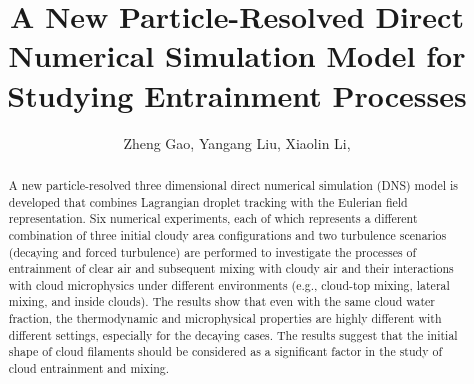 \documentclass[draft,jgrga]{AGUTeX}
\begin{document}
\title{A New Particle-Resolved Direct Numerical Simulation Model for Studying Entrainment Processes}
\author{Zheng Gao,
Yangang Liu,
Xiaolin Li,}


\begin{abstract}
A new particle-resolved three dimensional direct numerical simulation (DNS) model is developed that combines Lagrangian droplet tracking with the Eulerian field representation. Six numerical experiments, each of which represents a different combination of three initial cloudy area configurations and two turbulence scenarios (decaying and forced turbulence) are performed to investigate the processes of entrainment of clear air and subsequent mixing with cloudy air and their interactions with cloud microphysics under different environments (e.g., cloud-top mixing, lateral mixing, and inside clouds). The results show that even with the same cloud water fraction, the thermodynamic and microphysical properties are highly different with different settings, especially for the decaying cases. The results suggest that the initial shape of cloud filaments should be considered as a significant factor in the study of cloud entrainment and mixing.   
\end{abstract}
\end{document}

